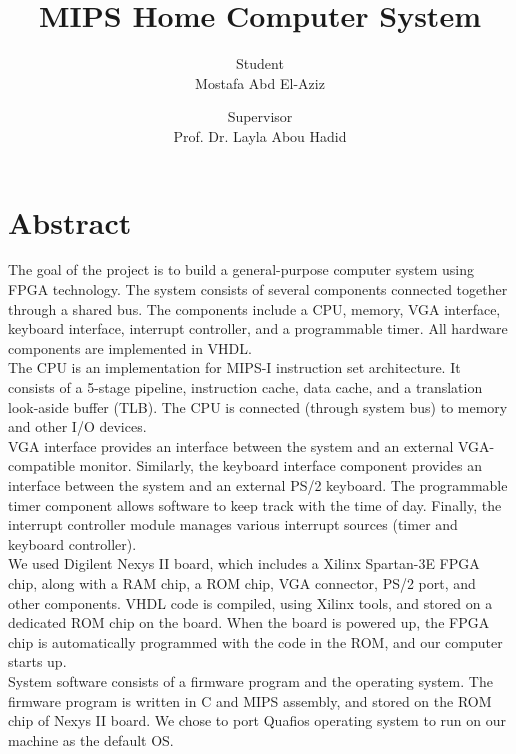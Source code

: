 \documentclass[oneside]{book}
\title{MIPS Home Computer System}
\author{
    \large Student\\
    \large Mostafa Abd El-Aziz\\
    \and
    \large Supervisor\\
    \large Prof. Dr. Layla Abou Hadid\\
}
\date{\vspace{-5ex}}
\begin{document}
\frontmatter


\makeititle


\newpage
\thispagestyle{plain}
\chapter{Abstract}

The goal of the project is to build a general-purpose computer system
using FPGA technology. The system consists of several components
connected together through a shared bus. The components include a CPU,
memory, VGA interface, keyboard interface, interrupt controller, and
a programmable timer. All hardware components are implemented in VHDL.\\

The CPU is an implementation for MIPS-I instruction set architecture.
It consists of a 5-stage pipeline, instruction cache, data cache, and
a translation look-aside buffer (TLB). The CPU is connected (through
system bus) to memory and other I/O devices.\\

VGA interface provides an interface between the system and an external
VGA-compatible monitor. Similarly, the keyboard interface component
provides an interface between the system and an external PS/2 keyboard.
The programmable timer component allows software to keep track
with the time of day. Finally, the interrupt controller module manages
various interrupt sources (timer and keyboard controller).\\

We used Digilent Nexys II board, which includes a Xilinx Spartan-3E
FPGA chip, along with a RAM chip, a ROM chip, VGA connector,
PS/2 port, and other components. VHDL code is compiled, using Xilinx
tools, and stored on a dedicated ROM chip on the board. When the board
is powered up, the FPGA chip is automatically programmed with the
code in the ROM, and our computer starts up.\\

System software consists of a firmware program and the operating
system. The firmware program is written in C and MIPS assembly,
and stored on the ROM chip of Nexys II board. We chose to port
Quafios operating system to run on our machine as the default OS.
\end{document}
